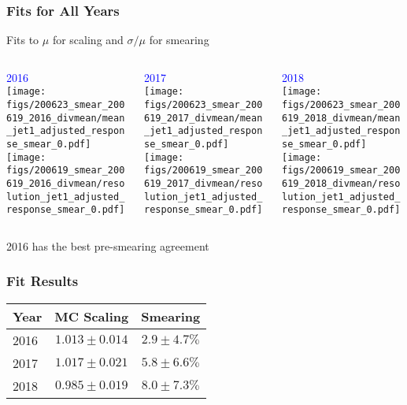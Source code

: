 \documentclass{beamer}
\begin{document}
\begin{frame}
  \frametitle{Fits for All Years}

  Fits to $\mu$ for scaling and $\sigma/\mu$ for smearing
  \vfill

  \begin{columns}
    \begin{column}{0.33\linewidth}
      \centering
      \textcolor{blue}{2016} \\
      \texttt{[image: figs/200623\_smear\_200619\_2016\_divmean/mean\_jet1\_adjusted\_response\_smear\_0.pdf]} \\
      \texttt{[image: figs/200619\_smear\_200619\_2016\_divmean/resolution\_jet1\_adjusted\_response\_smear\_0.pdf]}
    \end{column}
    \begin{column}{0.34\linewidth}
      \centering
      \textcolor{blue}{2017} \\
      \texttt{[image: figs/200623\_smear\_200619\_2017\_divmean/mean\_jet1\_adjusted\_response\_smear\_0.pdf]} \\
      \texttt{[image: figs/200619\_smear\_200619\_2017\_divmean/resolution\_jet1\_adjusted\_response\_smear\_0.pdf]}
    \end{column}
    \begin{column}{0.33\linewidth}
      \centering
      \textcolor{blue}{2018} \\
      \texttt{[image: figs/200623\_smear\_200619\_2018\_divmean/mean\_jet1\_adjusted\_response\_smear\_0.pdf]} \\
      \texttt{[image: figs/200619\_smear\_200619\_2018\_divmean/resolution\_jet1\_adjusted\_response\_smear\_0.pdf]}
    \end{column}
  \end{columns}

  \vfill
  2016 has the best pre-smearing agreement

\end{frame}


\begin{frame}
  \frametitle{Fit Results}

  \vfill
  \def\arraystretch{1.5}
  \begin{center}
    \begin{tabular}{|l|c|c|}
      \hline
      Year & MC Scaling & Smearing \\
      \hline
      2016 & $1.013 \pm 0.014$ & $2.9 \pm 4.7 \%$ \\
      2017 & $1.017 \pm 0.021$ & $5.8 \pm 6.6 \%$ \\
      2018 & $0.985 \pm 0.019$ & $8.0 \pm 7.3 \%$ \\
      \hline
    \end{tabular}
  \end{center}


\end{frame}
\end{document}
